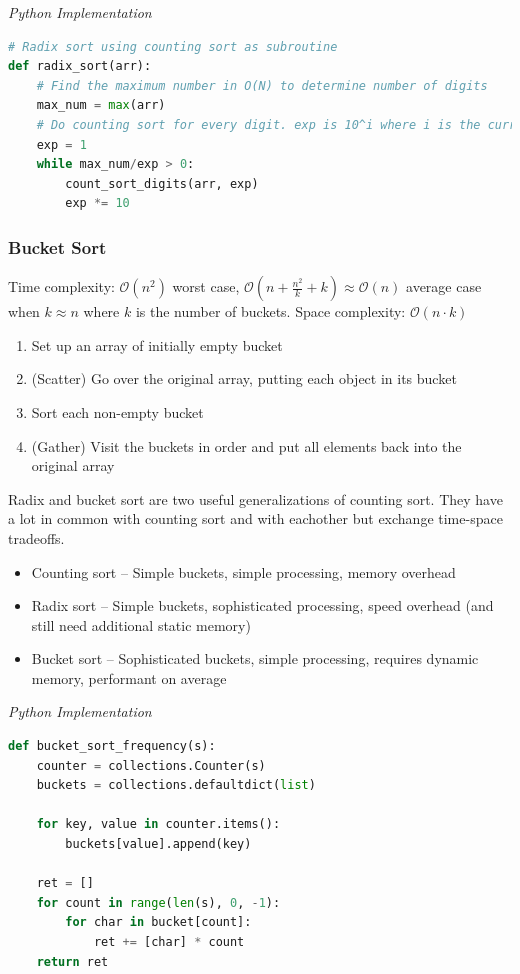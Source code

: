 \documentclass{article}
\newcommand{\bigO}{\mathcal{O}}
\begin{document}
\vspace{8pt} \emph{Python Implementation}
\begin{lstlisting}[language=Python]
# Radix sort using counting sort as subroutine
def radix_sort(arr): 
    # Find the maximum number in O(N) to determine number of digits
    max_num = max(arr) 
    # Do counting sort for every digit. exp is 10^i where i is the current digit number 
    exp = 1
    while max_num/exp > 0: 
        count_sort_digits(arr, exp) 
        exp *= 10
\end{lstlisting}
    
    \subsubsection{Bucket Sort}
    Time complexity: $\bigO(n^{2})$ worst case, 	$\bigO\left(n+{\frac {n^{2}}{k}}+k\right) \approx \bigO(n)$ average case when $k\approx n$ where $k$ is the number of buckets. Space complexity: $\bigO(n\cdot k)$
    
    \begin{enumerate}
        \item Set up an array of initially empty bucket
        \item (Scatter) Go over the original array, putting each object in its bucket
        \item Sort each non-empty bucket
        \item (Gather) Visit the buckets in order and put all elements back into the original array
    \end{enumerate}
    
    Radix and bucket sort are two useful generalizations of counting sort. They have a lot in common with counting sort and with eachother but exchange time-space tradeoffs.
    
    \begin{itemize}
        \item Counting sort -- Simple buckets, simple processing, memory overhead
        \item Radix sort -- Simple buckets, sophisticated processing, speed overhead (and still need additional static memory)
        \item Bucket sort -- Sophisticated buckets, simple processing, requires dynamic memory, performant on average
    \end{itemize}
     

\vspace{8pt} \emph{Python Implementation}
\begin{lstlisting}[language=Python]
def bucket_sort_frequency(s):
    counter = collections.Counter(s) 
    buckets = collections.defaultdict(list)
			
    for key, value in counter.items():  
        buckets[value].append(key)

    ret = []
    for count in range(len(s), 0, -1):  
        for char in bucket[count]:  
            ret += [char] * count
    return ret
\end{lstlisting}
\end{document}
